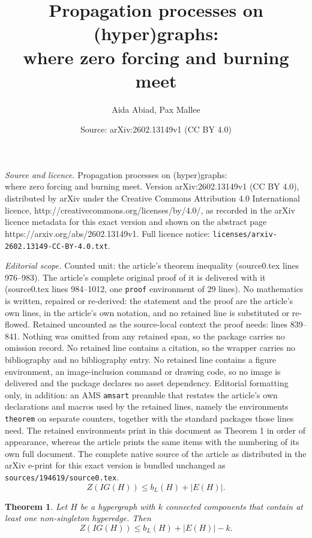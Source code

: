 \documentclass[10pt,a4paper]{amsart}
\title{Propagation processes on (hyper)graphs:\\ where zero forcing and burning meet}
\author{Aida Abiad, Pax Mallee}
\date{Source: arXiv:2602.13149v1 (CC BY 4.0)}
\newtheorem{theorem}{Theorem}
\begin{document}
\maketitle

\noindent\emph{Source and licence.} Propagation processes on (hyper)graphs:\\ where zero forcing and burning meet. Version arXiv:2602.13149v1 (CC BY 4.0), distributed by arXiv under the Creative Commons Attribution 4.0 International licence, http://creativecommons.org/licenses/by/4.0/, as recorded in the arXiv licence metadata for this exact version and shown on the abstract page https://arxiv.org/abs/2602.13149v1. Full licence notice: \texttt{licenses/arxiv-2602.13149-CC-BY-4.0.txt}.\par\smallskip

\noindent\textit{Editorial scope.} Counted unit: the article's theorem inequality (source0.tex lines 976--983). The article's complete original proof of it is delivered with it (source0.tex lines 984--1012, one \texttt{proof} environment of 29 lines). No mathematics is written, repaired or re-derived: the statement and the proof are the article's own lines, in the article's own notation, and no retained line is substituted or re-flowed.  Retained uncounted as the source-local context the proof needs: lines 839--841.  Nothing was omitted from any retained span, so the package carries no omission record.  No retained line contains a citation, so the wrapper carries no bibliography and no bibliography entry.  No retained line contains a figure environment, an image-inclusion command or drawing code, so no image is delivered and the package declares no asset dependency.  Editorial formatting only, in addition: an AMS \texttt{amsart} preamble that restates the article's own declarations and macros used by the retained lines, namely the environments \texttt{theorem} on separate counters, together with the standard packages those lines need.  The retained environments print in this document as Theorem 1 in order of appearance, whereas the article prints the same items with the numbering of its own full document.  The complete native source of the article as distributed in the arXiv e-print for this exact version is bundled unchanged as \texttt{sources/194619/source0.tex}.
   \begin{equation}\label{eq:hypergraph inequality}
           Z(IG(H)) \leq b_L(H) + |E(H)|.
   \end{equation}

\begin{theorem}
    Let $H$ be a hypergraph with $k$ connected components that contain at least one non-singleton hyperedge. Then
    \begin{equation}
        Z(IG(H)) \leq b_L(H) + |E(H)| - k.
        \label{eq:component hypergraph inequality}
    \end{equation}
    \label{thm:improved bound}
\end{theorem}
\end{document}
